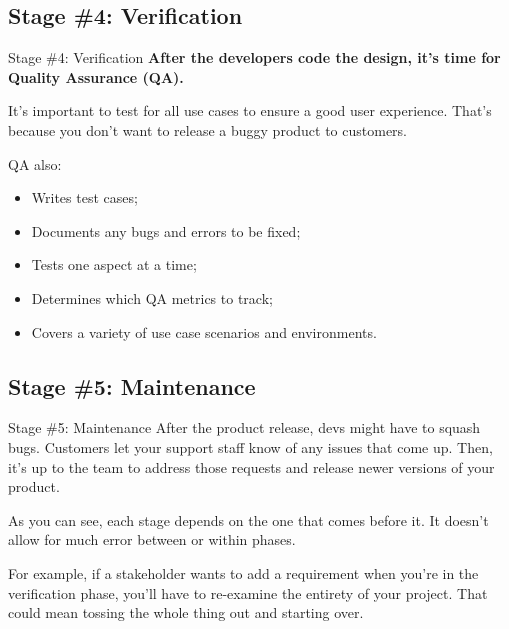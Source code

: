 \documentclass[
    notheorems,
    11pt,
    compress,
    aspectratio=169
]{beamer}
\begin{document}

\subsection{Stage \#4: Verification}

\begin{frame}{Stage \#4: Verification}
    \textbf{After the developers code the design, it’s time for Quality Assurance (QA).}

    It’s important to test for all use cases to ensure a good user experience. That’s because you don’t want to release a buggy product to customers.

    \pause
    \vfill

    QA also:

    \begin{itemize}
        \item Writes test cases;
        \item Documents any bugs and errors to be fixed;
        \item Tests one aspect at a time;
        \item Determines which QA metrics to track;
        \item Covers a variety of use case scenarios and environments.
    \end{itemize}
\end{frame}


\subsection{Stage \#5: Maintenance}

\begin{frame}{Stage \#5: Maintenance}
    After the product release, devs might have to squash bugs. Customers let your support staff know of any issues that come up. Then, it’s up to the team to address those requests and release newer versions of your product.

    \pause
    \vfill

    As you can see, each stage depends on the one that comes before it. It doesn’t allow for much error between or within phases.

    \pause
    \vfill

    For example, if a stakeholder wants to add a requirement when you’re in the verification phase, you’ll have to re-examine the entirety of your project. That could mean tossing the whole thing out and starting over.
\end{frame}
\end{document}

